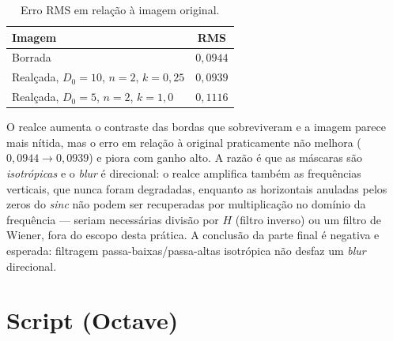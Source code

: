 \documentclass[11pt,a4paper]{article}
\begin{document}
\begin{table}[H]
\centering
\caption{Erro RMS em relação à imagem original.}
\begin{tabular}{lc}
\toprule
\textbf{Imagem} & \textbf{RMS} \\
\midrule
Borrada                          & $0{,}0944$ \\
Realçada, $D_0=10$, $n=2$, $k=0{,}25$ & $0{,}0939$ \\
Realçada, $D_0=5$,  $n=2$, $k=1{,}0$  & $0{,}1116$ \\
\bottomrule
\end{tabular}
\end{table}

O realce aumenta o contraste das bordas que sobreviveram e a imagem parece mais nítida,
mas o erro em relação à original praticamente não melhora ($0{,}0944 \to 0{,}0939$) e
piora com ganho alto. A razão é que as máscaras são \emph{isotrópicas} e o \emph{blur} é
direcional: o realce amplifica também as frequências verticais, que nunca foram
degradadas, enquanto as horizontais anuladas pelos zeros do \emph{sinc} não podem ser
recuperadas por multiplicação no domínio da frequência --- seriam necessárias divisão por
$H$ (filtro inverso) ou um filtro de Wiener, fora do escopo desta prática. A conclusão da
parte final é negativa e esperada: filtragem passa-baixas/passa-altas isotrópica não
desfaz um \emph{blur} direcional.

\section*{Script (Octave)}


\end{document}
